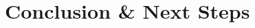 \documentclass[aspectratio=1610]{beamer}
\begin{document}
\section[Conclusion \& Next Steps]{Conclusion \& Next Steps}

\end{document}

